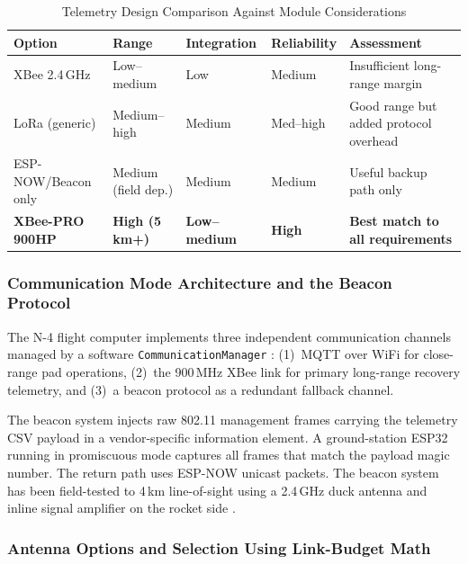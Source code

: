 \begin{table}[!htbp]
  \centering
  \caption{Telemetry Design Comparison Against Module Considerations}
  \label{tab:telemetry_option_compare}
  \small
  \renewcommand{\arraystretch}{1.2}
  \begin{tabular}{@{}p{2.8cm}|p{2.0cm}|p{2.3cm}|p{2.5cm}|p{3.7cm}@{}}
    \toprule
    \rowcolor{gray!22}\textbf{Option} & \textbf{Range} & \textbf{Integration} & \textbf{Reliability} & \textbf{Assessment} \\ \midrule
    XBee 2.4\,GHz & Low--medium & Low & Medium & Insufficient long-range margin \\
    LoRa (generic) & Medium--high & Medium & Med--high & Good range but added protocol overhead \\
    ESP-NOW/Beacon only & Medium (field dep.) & Medium & Medium & Useful backup path only \\
    \textbf{XBee-PRO 900HP} & \textbf{High (5\,km+)} & \textbf{Low--medium} & \textbf{High} & \textbf{Best match to all requirements} \\ \bottomrule
  \end{tabular}
\end{table}

\subsubsection{Communication Mode Architecture and the Beacon Protocol}

The N-4 flight computer implements three independent communication channels
managed by a software \texttt{CommunicationManager} \cite{n4_comm_architecture}:
(1)~MQTT over WiFi for close-range pad operations, (2)~the 900\,MHz XBee link
for primary long-range recovery telemetry, and (3)~a beacon protocol as a
redundant fallback channel.

The beacon system injects raw 802.11 management frames carrying the telemetry
CSV payload in a vendor-specific information element. A ground-station ESP32
running in promiscuous mode captures all frames that match the payload magic
number. The return path uses ESP-NOW unicast packets. The beacon system has
been field-tested to 4\,km line-of-sight using a 2.4\,GHz duck antenna and
inline signal amplifier on the rocket side \cite{n4_beacon_configuration}.

\subsubsection{Antenna Options and Selection Using Link-Budget Math}

